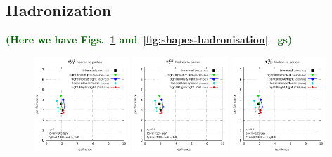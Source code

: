 \documentclass[11pt,letterpaper]{article}
\newcommand{\gs}[1]{\textbf{\textcolor{darkgreen}{(#1 --gs)}}}
\begin{document}
\subsection{Hadronization}\label{sec:hadr}

\gs{Here we have Figs.~\ref{fig:grooming-hadronisation} and~\ref{fig:shapes-hadronisation}}


\begin{figure}
  \includegraphics[width=0.32\textwidth,page=25]{figures/grooming-scan-levels.pdf}
  \hfill
  \includegraphics[width=0.32\textwidth,page=13]{figures/grooming-scan-levels.pdf}
  \hfill
  \includegraphics[width=0.32\textwidth,page=31]{figures/grooming-scan-levels.pdf}
  \caption{}\label{fig:grooming-hadronisation}
\end{figure}
\end{document}
